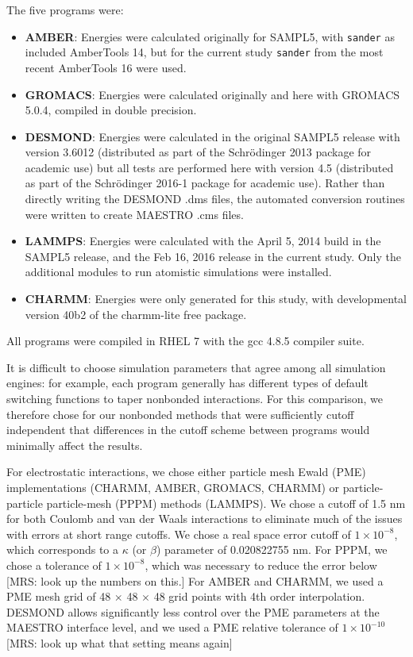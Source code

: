 The five programs were:
\begin{itemize} 
\item {\bf AMBER}: Energies were calculated originally for SAMPL5, with
  {\tt sander} as included AmberTools 14, but for the current study
  {\tt sander} from the most recent AmberTools 16 were used.
\item {\bf GROMACS}: Energies were calculated originally and here with
  GROMACS 5.0.4, compiled in double precision.
\item {\bf DESMOND}: Energies were calculated in the original
  SAMPL5 release with version 3.6012 (distributed as part of the Schr\"odinger
  2013 package for academic use) but all tests are performed here with
  version 4.5 (distributed as part of the Schr\"odinger
  2016-1 package for academic use).  Rather than directly writing the
  DESMOND .dms files, the automated conversion routines were written to
  create MAESTRO .cms files.
\item {\bf LAMMPS}: Energies were calculated with the April 5,
  2014 build in the SAMPL5 release, and the Feb 16, 2016 release in
  the current study. Only the additional modules to run atomistic
  simulations were installed.
\item {\bf CHARMM}: Energies were only generated for this study, with
  developmental version 40b2 of the charmm-lite free package.
\end{itemize}

All programs were compiled in RHEL 7 with the gcc 4.8.5 compiler
suite.

It is difficult to choose simulation parameters that agree among all
simulation engines: for example, each program generally has different
types of default switching functions to taper nonbonded
interactions. For this comparison, we therefore chose for our
nonbonded methods that were sufficiently cutoff independent that
differences in the cutoff scheme between programs would minimally
affect the results.

For electrostatic interactions, we chose either particle mesh Ewald
(PME) implementations (CHARMM, AMBER, GROMACS, CHARMM) or
particle-particle particle-mesh (PPPM) methods (LAMMPS). We chose a
cutoff of 1.5 nm for both Coulomb and van der Waals interactions to
eliminate much of the issues with errors at short range cutoffs. We
chose a real space error cutoff of $1\times 10^{-8}$, which corresponds
to a $\kappa$ (or $\beta$) parameter of 0.020822755 nm.  For PPPM, we
chose a tolerance of $1\times10^{-8}$, which was necessary to reduce
the error below [MRS: look up the numbers on this.] For AMBER and
CHARMM, we used a PME mesh grid of 48 $\times$ 48 $\times$ 48 grid
points with 4th order interpolation. DESMOND allows significantly less
control over the PME parameters at the MAESTRO interface level, and we
used a PME relative tolerance of $1\times 10^{-10}$ [MRS: look up what
  that setting means again]

